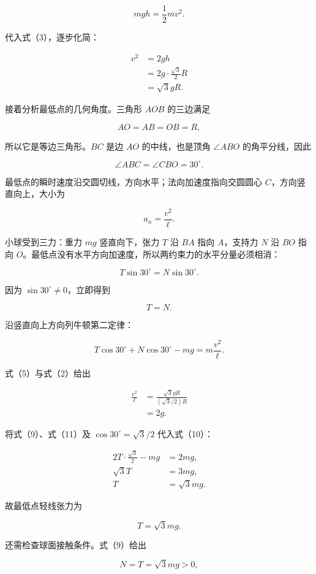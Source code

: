 \documentclass[12pt,a4paper,UTF8]{ctexart}
\begin{document}
\[
mgh=\frac12mv^2. \tag{4}
\]

代入式（3），逐步化简：

\[
\begin{aligned}
v^2
&=2gh\\
&=2g\cdot\frac{\sqrt3}{2}R\\
&=\sqrt3gR.
\end{aligned} \tag{5}
\]

接着分析最低点的几何角度。三角形 \(AOB\) 的三边满足

\[
AO=AB=OB=R,
\]

所以它是等边三角形。\(BC\) 是边 \(AO\) 的中线，也是顶角 \(\angle ABO\)
的角平分线，因此

\[
\angle ABC=\angle CBO=30^\circ. \tag{6}
\]

最低点的瞬时速度沿交圆切线，方向水平；法向加速度指向交圆圆心
\(C\)，方向竖直向上，大小为

\[
a_n=\frac{v^2}{\ell}. \tag{7}
\]

小球受到三力：重力 \(mg\) 竖直向下，张力 \(T\) 沿 \(BA\) 指向
\(A\)，支持力 \(N\) 沿 \(BO\) 指向
\(O\)。最低点没有水平方向加速度，所以两约束力的水平分量必须相消：

\[
T\sin30^\circ=N\sin30^\circ. \tag{8}
\]

因为 \(\sin30^\circ\neq0\)，立即得到

\[
T=N. \tag{9}
\]

沿竖直向上方向列牛顿第二定律：

\[
T\cos30^\circ+N\cos30^\circ-mg
=m\frac{v^2}{\ell}. \tag{10}
\]

式（5）与式（2）给出

\[
\begin{aligned}
\frac{v^2}{\ell}
&=\frac{\sqrt3gR}{(\sqrt3/2)R}\\
&=2g.
\end{aligned} \tag{11}
\]

将式（9）、式（11）及 \(\cos30^\circ=\sqrt3/2\) 代入式（10）：

\[
\begin{aligned}
2T\cdot\frac{\sqrt3}{2}-mg&=2mg,\\
\sqrt3T&=3mg,\\
T&=\sqrt3mg.
\end{aligned} \tag{12}
\]

故最低点轻线张力为

\[
\boxed{T=\sqrt3mg}. \tag{13}
\]

还需检查球面接触条件。式（9）给出

\[
N=T=\sqrt3mg>0,
\]
\end{document}
